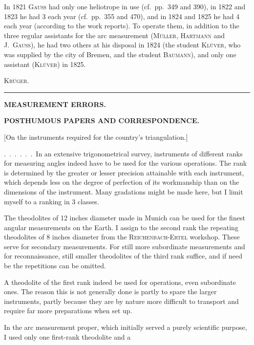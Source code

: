 In 1821 \textsc{Gauss} had only one heliotrope in use (cf.\ pp.~349 and 390), in 1822 and 1823 he had 3 each
year (cf.\ pp.~355 and 470), and in 1824 and 1825 he had 4 each year (according to the work reports).
To operate them, in addition to the three regular assistants for the arc measurement (\textsc{Müller}, \textsc{Hartmann} and
\textsc{J.~Gauss}), he had two others at his disposal in 1824 (the student \textsc{Klüver}, who was supplied by the city of Bremen,
and the student \textsc{Baumann}), and only one assistant (\textsc{Klüver}) in 1825.
\par\hfill\textsc{Krüger.}\par\endgroup
\vspace{20mm}
\begin{center}\rule{40mm}{.4pt}\end{center}

\clearpage
\vspace*{40mm}
\begin{center}{\Large\bfseries MEASUREMENT ERRORS.}\end{center}
\clearpage\null\clearpage
\vspace*{14mm}
\begin{center}
{\Large\bfseries POSTHUMOUS PAPERS AND CORRESPONDENCE.}\par\vspace{10mm}
[On the instruments required for the country's triangulation.]
\end{center}
.\ .\ .\ .\ .\ .\ In an extensive trigonometrical survey, instruments of different ranks
for measuring angles indeed have to be used for the various operations. The rank
is determined by the greater or lesser precision attainable with each instrument,
which depends less on the degree of perfection of its workmanship than on the
dimensions of the instrument. Many gradations might be made here, but I limit
myself to a ranking in 3 classes.

The theodolites of 12 inches diameter made in Munich can be used for the
finest angular measurements on the Earth. I assign to the second rank the
repeating theodolites of 8 inches diameter from the \textsc{Reichenbach-Ertel}
workshop. These serve for secondary measurements. For still more subordinate
measurements and for reconnaissance, still smaller theodolites of the third
rank suffice, and if need be the repetitions can be omitted.

A theodolite of the first rank  indeed be used for
 operations, even subordinate ones. The reason this is not generally done is partly
to spare the larger instruments, partly because they are by nature more
difficult to transport and require far more preparations when set up.

In the arc measurement proper, which initially served a purely scientific
purpose, I used only one first-rank theodolite and a
